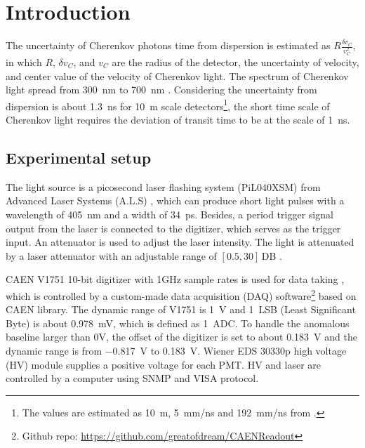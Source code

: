 \section{Introduction}
\label{SetUp}
The uncertainty of Cherenkov photons time from dispersion is estimated as $R\frac{\delta v_C}{v_C^2}$, in which $R$, $\delta v_C$, and $v_C$ are the radius of the detector, the uncertainty of velocity, and center value of the velocity of Cherenkov light. The spectrum of Cherenkov light spread from \SI{300}{nm} to \SI{700}{nm} \cite{Luo:2022xrd}. Considering the uncertainty from dispersion is about \SI{1.3}{ns} for \SI{10}{m} scale detectors\footnote{The values are estimated as \SI{10}{m}, \SI{5}{mm/ns} and \SI{192}{mm/ns} from \cite{Luo:2022xrd}.}, the short time scale of Cherenkov light requires the deviation of transit time to be at the scale of \SI{1}{ns}.
\subsection{Experimental setup}
\label{sec:setup}

The light source is a picosecond laser flashing system (PiL040XSM) from Advanced Laser Systems (A.L.S) \cite{NTKLaser}, which can produce short light pulses with a wavelength of \SI{405}{nm} and a width of \SI{34}{ps}. Besides, a period trigger signal output from the laser is connected to the digitizer, which serves as the trigger input. An attenuator is used to adjust the laser intensity. The light is attenuated by a laser attenuator with an adjustable range of $[0.5,30]$\,DB \cite{Attenuator}.

CAEN V1751 10-bit digitizer with 1GHz sample rates is used for data taking \cite{CAENV1751}, which is controlled by a custom-made data acquisition (DAQ) software\footnote{Github repo: \url{https://github.com/greatofdream/CAENReadout}} based on CAEN library. The dynamic range of V1751 is \SI{1}{V} and \SI{1}{LSB} (Least Significant Byte) is about \SI{0.978}{mV}, which is defined as \SI{1}{ADC}. To handle the anomalous baseline larger than 0V, the offset of the digitizer is set to about \SI{0.183}{V} and the dynamic range is from \SI{-0.817}{V} to \SI{0.183}{V}. Wiener EDS 30330p high voltage (HV) module \cite{WIENERHV} supplies a positive voltage for each PMT. HV and laser are controlled by a computer using SNMP \cite{SNMP} and VISA \cite{VISA} protocol.

